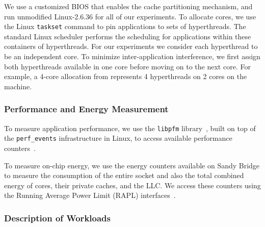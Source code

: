 
We use a customized BIOS that enables the cache partitioning
mechanism, and run unmodified Linux-2.6.36 for all of our experiments.
To allocate cores, we use the Linux \texttt{taskset} command to pin applications to
sets of hyperthreads. The standard Linux scheduler performs the scheduling for applications within these containers of hyperthreads. For our experiments we consider each hyperthread to be an independent core. To minimize inter-application interference, we first assign both hyperthreads available in one core before moving on to the next core. For example, a 4-core allocation from \pacora represents 4 hyperthreads on 2 cores on the machine.

\subsubsection{Performance and Energy Measurement}

To measure application performance, we use the \texttt{libpfm}
library~\cite{Eranian:OLS06,Perfmon2}, built on top of the
\texttt{perf\_events} infrastructure in Linux, to
access available performance counters~\cite{Intel:Manual2012}.

To measure on-chip energy, we use the energy counters available on
Sandy Bridge to measure the consumption of  the entire socket and also
the total combined energy of cores, their private caches, and the
LLC. We access these counters using the Running Average Power Limit
(RAPL) interfaces~\cite{Intel:Manual2012}.  %


\subsubsection{Description of Workloads}

